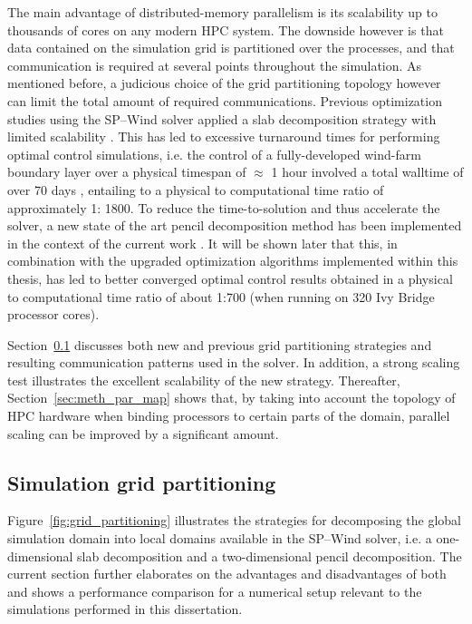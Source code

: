 The main advantage of distributed-memory parallelism is its scalability up to thousands of cores on any modern HPC system. The downside however is
that data contained on the simulation grid is partitioned over the processes, and that communication is required at several points throughout the
simulation. As mentioned before, a judicious choice of the grid partitioning topology however can limit the total amount of required communications.
Previous optimization studies using the SP--Wind solver applied a slab decomposition strategy with limited scalability \citep{delport2009constrained,
goit2015optimal}. This has led to excessive turnaround times for performing optimal control simulations, i.e. the control of a fully-developed
wind-farm boundary layer over a physical timespan of $\approx$ 1 hour involved a total walltime of over 70 days \citep{goit2015optimal}, entailing to
a physical to computational time ratio of approximately 1: 1800. To reduce the time-to-solution and thus accelerate the solver, a new state of the art
pencil decomposition method has been implemented in the context of the current work \citep{li20102decomp}. It will be shown later that this, in
combination with the upgraded optimization algorithms implemented within this thesis, has led to better converged optimal control results obtained in
a physical to computational time ratio of about 1:700 (when running on 320 Ivy Bridge processor cores).

Section~\ref{sec:meth_par_part} discusses both new and previous grid partitioning strategies and resulting communication patterns used in the solver. In addition, a strong scaling test illustrates the excellent scalability of the new strategy. Thereafter, Section~\ref{sec:meth_par_map} shows that, by taking into account the topology of HPC hardware when binding processors to certain parts of the domain, parallel scaling can be improved by a significant amount.

\subsection{Simulation grid partitioning}\label{sec:meth_par_part}
Figure~\ref{fig:grid_partitioning} illustrates the strategies for decomposing the global simulation domain into local domains available in the SP--Wind solver, i.e. a one-dimensional slab decomposition and a two-dimensional pencil decomposition. The current section further elaborates on the advantages and disadvantages of both and shows a performance comparison for a numerical setup relevant to the simulations performed in this dissertation. 

